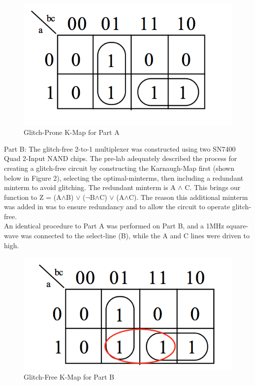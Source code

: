 \documentclass{scrartcl}
\begin{document}
\begin{figure} [H]
	\centering
	\includegraphics[scale = 0.5]{K-Map-Glitch-Prone.png}
	\caption{Glitch-Prone K-Map for Part A}
	\label{fig:k-map-glitch-prone}
\end{figure}


Part B: The glitch-free 2-to-1 multiplexer was constructed using two SN7400 Quad 2-Input NAND chips. The pre-lab adequately described the process for creating a glitch-free circuit by constructing the Karnaugh-Map first (shown below in Figure 2), selecting the optimal-minterms, then including a redundant minterm to avoid glitching. The redundant minterm is A $\land$ C. This brings our function to Z =  (A$\land$B) $\lor$ ($\neg$B$\land$C) $\lor$  (A$\land$C). The reason this additional minterm was added in was to ensure redundancy and to allow the circuit to operate glitch-free. \\

An identical procedure to Part A was performed on Part B, and a 1MHz square-wave was connected to the select-line (B), while the A and C lines were driven to high. 

\begin{figure} [H]
	\centering
	\includegraphics[scale = 0.5]{K-Map-Glitch-Free.png}
	\caption{Glitch-Free K-Map for Part B}
	\label{fig:k-map-glitch-free}
\end{figure}
\end{document}
